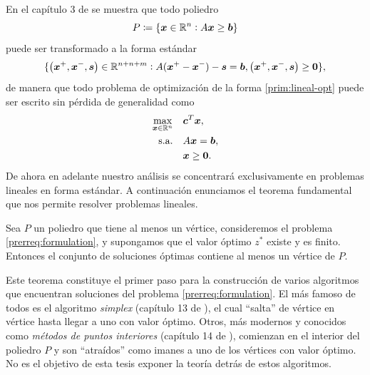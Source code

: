 En el capítulo 3 de \cite{fabs} se muestra que todo poliedro
\begin{equation*}
	P \coloneq \lbrace \boldsymbol{x} \in \mathbb{R}^n \vcentcolon A\boldsymbol{x} \geq \boldsymbol{b} \rbrace
\end{equation*}
puede ser transformado a la forma estándar
\begin{equation*}
	\lbrace \left( \boldsymbol{x}^+, \boldsymbol{x}^-, \boldsymbol{s} \right) \in \mathbb{R}^{n + n + m} \vcentcolon A(\boldsymbol{x}^+ -
\boldsymbol{x}^-) - \boldsymbol{s} = \boldsymbol{b}, \left(\boldsymbol{x}^+, \boldsymbol{x}^-, \boldsymbol{s}\right) \geq \boldsymbol{0}\rbrace,
\end{equation*}
de manera que todo problema de optimización de la forma \eqref{prim:lineal-opt} puede ser escrito
sin pérdida de generalidad como
\begin{subequations}
	\label{prerreq:formulation}
	\begin{align}
		\max_{\boldsymbol{x} \in \mathbb{R}^n} \quad
			& \boldsymbol{c}^T\boldsymbol{x}, \label{prerreq:formulation:objective} \\
		\text{s.a.} \quad
			& A\boldsymbol{x} = \boldsymbol{b}, \label{prerreq:formulation:constraints} \\
			& \boldsymbol{x} \geq \boldsymbol{0} \nonumber.
	\end{align}
\end{subequations}
De ahora en adelante nuestro análisis se concentrará exclusivamente en problemas lineales en forma
estándar. A continuación enunciamos el teorema fundamental que nos permite resolver problemas
lineales.
\begin{theorem}
	\label{prerreq:th:linear-sol}
	Sea $P$ un poliedro que tiene al menos un vértice, consideremos el problema
	\eqref{prerreq:formulation}, y supongamos que el valor óptimo $z^*$ existe y es finito. Entonces
	el conjunto de soluciones óptimas contiene al menos un vértice de $P$.
\end{theorem}

Este teorema constituye el primer paso para la construcción de varios algoritmos que encuentran
soluciones del problema \eqref{prerreq:formulation}. El más famoso de todos es el algoritmo
\emph{simplex} (capítulo 13 de \cite{nocedal}), el cual ``salta'' de vértice en vértice hasta llegar
a uno con valor óptimo. Otros, más modernos y conocidos como \emph{métodos de puntos interiores}
(capítulo 14 de \cite{nocedal}), comienzan en el interior del poliedro $P$ y son ``atraídos'' como
imanes a uno de los vértices con valor óptimo. No es el objetivo de esta tesis exponer la teoría
detrás de estos algoritmos.

